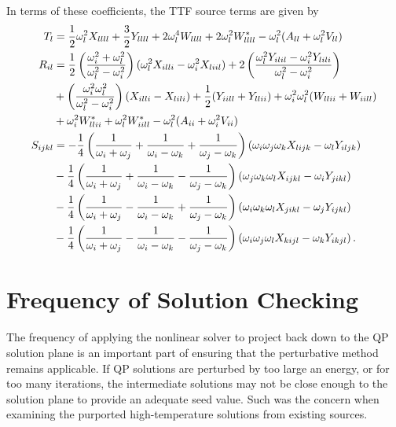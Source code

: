 \documentclass[../PhD.tex]{subfiles}
\begin{document}
\begin{subappendices}
In terms of these coefficients, the TTF source terms are given by
\begin{align}
\label{T calc}
T_l &= \frac{1}{2} \omega_l^2 X_{llll} + \frac{3}{2} Y_{llll} + 2\omega_l^4 W_{llll} + 2\omega_l^2 W^*_{llll} - \omega_l^2 (A_{ll} + \omega_l^2 V_{ll} ) \\
\label{R calc}
R_{il} &=\frac{1}{2} \left(\frac{\omega_i^2 + \omega_l^2}{\omega_l^2 - \omega_i^2}\right) (\omega_l^2 X_{illi} - \omega_i^2 X_{liil}) + 2\left(\frac{\omega_l^2 Y_{ilil} - \omega_i^2 Y_{lili}}{\omega_l^2 - \omega_i^2} \right) \nonumber \\
&+ \left(\frac{\omega_i^2 \omega_l^2}{\omega_l^2 - \omega_i^2}\right) (X_{illi} - X_{lili}) + \frac{1}{2} (Y_{iill} + Y_{llii}) + \omega_i^2 \omega_l^2 (W_{llii} + W_{iill}) \nonumber \\
&+ \omega_i^2 W^*_{llii} + \omega_l^2 W^*_{iill} - \omega_l^2 (A_{ii} + \omega_i^2 V_{ii} ) \\
\label{S calc}
S_{ijkl} &= -\frac{1}{4} \left( \frac{1}{\omega_i + \omega_j} + \frac{1}{\omega_i - \omega_k} + \frac{1}{\omega_j - \omega_k} \right) (\omega_i \omega_j \omega_k X_{lijk} - \omega_l Y_{iljk}) \nonumber \\
& - \frac{1}{4} \left( \frac{1}{\omega_i + \omega_j} +\frac{1}{\omega_i - \omega_k} - \frac{1}{\omega_j - \omega_k} \right) (\omega_j \omega_k \omega_l X_{ijkl} - \omega_i Y_{jikl} ) \nonumber \\
& -\frac{1}{4} \left( \frac{1}{\omega_i + \omega_j} - \frac{1}{\omega_i - \omega_k} + \frac{1}{\omega_j -\omega_k} \right) (\omega_i \omega_k \omega_l X_{jikl} - \omega_j Y_{ijkl} ) \nonumber \\
& -\frac{1}{4} \left( \frac{1}{\omega_i + \omega_j} - \frac{1}{\omega_i - \omega_k} - \frac{1}{\omega_j - \omega_k} \right) (\omega_i \omega_j \omega_l X_{kijl} - \omega_k Y_{ikjl}) \, .
\end{align}


\section{Frequency of Solution Checking}
\label{app: reop freq}

The frequency of applying the nonlinear solver to project back down to the QP solution plane is an important part of ensuring that the perturbative method remains applicable. If QP solutions are perturbed by too large an energy, or for too many iterations, the intermediate solutions may not be close enough to the solution plane to provide an adequate seed value. Such was the concern when examining the purported high-temperature solutions from existing sources.


\end{subappendices}
\end{document}
